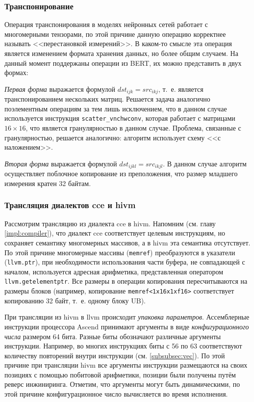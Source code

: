 \subsubsection{Транспонирование}

Операция транспонирования в моделях нейронных сетей работает с многомерными
тензорами, по этой причине данную операцию корректнее называть <<перестановкой
измерений>>. В каком-то смысле эта операция является изменением формата хранения
данных, но более общим случаем. На данный момент поддержаны операции из BERT,
их можно представить в двух формах:

\textit{Первая форма} выражается формулой $dst_{ijk} = src_{ikj}$, т.~е.
является транспонированием нескольких матриц. Решается задача аналогично
поэлементным операциям за тем лишь исключением, что в данном случае используется
инструкция \texttt{scatter\_vnchwconv}, которая работает с матрицами
$16 \times 16$, что является гранулярностью в данном случае. Проблема, связанные
с гранулярностью, решается аналогично: алгоритм использует схему <<с наложением>>.

\textit{Вторая форма} выражается формулой $dst_{ijkl} = src_{ikjl}$. В данном
случае алгоритм осуществляет поблочное копирование из преположения, что размер
младшего измерения кратен 32 байтам.

\subsubsection{Трансляция диалектов cce и hivm}

Рассмотрим трансляцию из диалекта cce в hivm.
Напомним (см. главу \ref{impl:compiler}), что диалект cce соответствует целевым
инструкциям, но сохраняет семантику многомерных массивов, а в hivm эта семантика
отсутствует. По этой причине многомерные массивы (\texttt{memref}) преобразуются
в указатели (\texttt{llvm.ptr}), при необходимости использования части буфера,
не совпадающей с началом, используется адресная арифметика, представленная
оператором \texttt{llvm.getelementptr}. Все размеры в операции копирования
пересчитываются на размеры блоков (например, копирование
\texttt{memref<1x16x1xf16>} соответствует копированию 32 байт, т.~е. одному блоку
UB).

При трансляции из hivm в llvm происходит \textit{упаковка параметров}.
Ассемблерные инструкции процессора Ascend принимают аргументы в виде
\textit{конфигурационного числа} размером 64 бита. Разные биты обозначают
различные аргументы инструкции. Например, во многих инструкциях биты с 56 по 63
соответствуют количеству повторений внутри инструкции (см. \ref{subsubsec:vec}).
По этой причине при трансляции hivm все аргументы инструкции размещаются на своих
позициях с помощью побитовой арифметики, позиции были получены путём реверс
инжиниринга. Отметим, что аргументы могут быть динамическими, по этой причине
конфигурационное число вычисляется во время исполнения.

